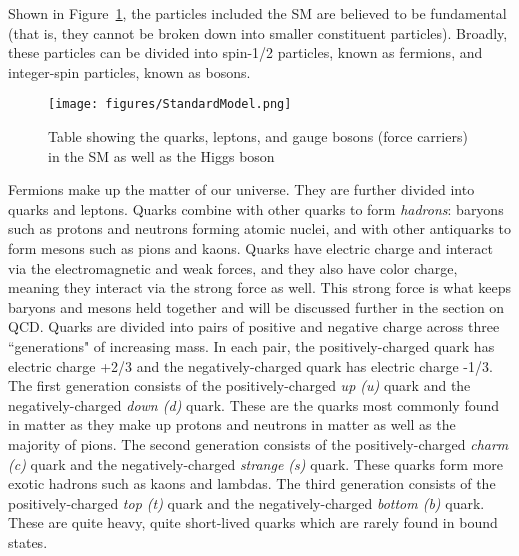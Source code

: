 Shown in Figure~\ref{fig:StandardModel}, the particles included the SM are believed to be fundamental (that is, they cannot be broken down into smaller constituent particles). Broadly, these particles can be divided into spin-1/2 particles, known as fermions, and integer-spin particles, known as bosons. 

\begin{figure}
\centering
  \texttt{[image: figures/StandardModel.png]}
  \caption{\label{fig:StandardModel} Table showing the quarks, leptons, and gauge bosons (force carriers) in the SM as well as the Higgs boson}
\end{figure}


Fermions make up the matter of our universe. They are further divided into quarks and leptons. Quarks combine with other quarks to form \textit{hadrons}: baryons such as protons and neutrons forming atomic nuclei, and with other antiquarks to form mesons such as pions and kaons. Quarks have electric charge and interact via the electromagnetic and weak forces, and they also have color charge, meaning they interact via the strong force as well. This strong force is what keeps baryons and mesons held together and will be discussed further in the section on QCD. Quarks are divided into pairs of positive and negative charge across three ``generations" of increasing mass. In each pair, the positively-charged quark has electric charge +2/3 and the negatively-charged quark has electric charge -1/3. The first generation consists of the positively-charged \textit{up (u)} quark and the negatively-charged \textit{down (d)} quark. These are the quarks most commonly found in matter as they make up protons and neutrons in matter as well as the majority of pions. The second generation consists of the positively-charged \textit{charm (c)} quark and the negatively-charged \textit{strange (s)} quark. These quarks form more exotic hadrons such as kaons and lambdas. The third generation consists of the positively-charged \textit{top (t)} quark and the negatively-charged \textit{bottom (b)} quark. These are quite heavy, quite short-lived quarks which are rarely found in bound states.

